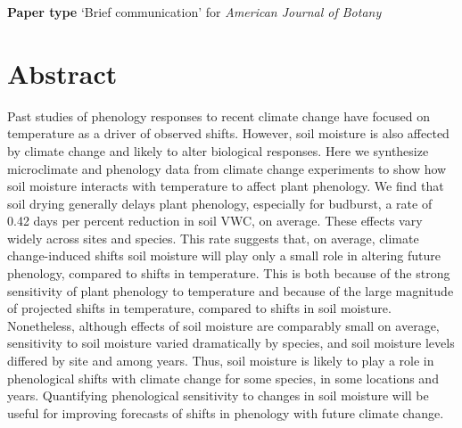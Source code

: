 \documentclass{article}
\begin{document}
\textbf{Paper type} `Brief communication' for \emph{American Journal of Botany}








\linenumbers
\section*{Abstract}
Past studies of phenology responses to recent climate change have focused on temperature as a driver of observed shifts. However, soil moisture is also affected by climate change and likely to alter biological responses. Here we synthesize microclimate and phenology data from climate change experiments to show how soil moisture interacts with temperature to affect plant phenology. We find that soil drying generally delays plant phenology, especially for budburst, a rate of 0.42 days per percent reduction in soil VWC, on average. These effects vary widely across sites and species. This rate suggests that, on average, climate change-induced shifts soil moisture will play only a small role in altering future phenology, compared to shifts in temperature. This is both because of the strong sensitivity of plant phenology to temperature and because of the large magnitude of projected shifts in temperature, compared to shifts in soil moisture. Nonetheless, although effects of soil moisture are comparably small on average, sensitivity to soil moisture varied dramatically by species, and soil moisture levels differed by site and among years. Thus, soil moisture is likely to play a role in phenological shifts with climate change for some species, in some locations and years. Quantifying phenological sensitivity to changes in soil moisture will be useful for improving forecasts of shifts in phenology with future climate change.  

\newpage
\end{document}
